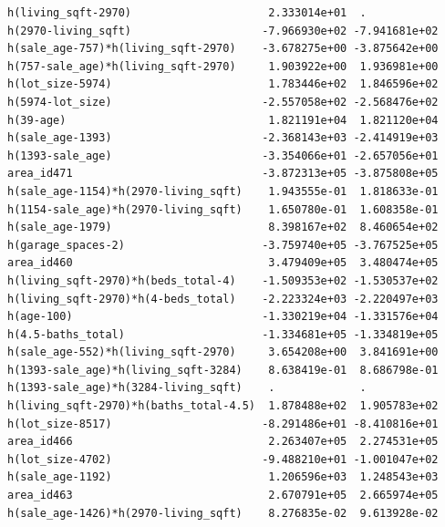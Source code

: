 \documentclass[
]{article}
\begin{document}
\begin{verbatim}
h(living_sqft-2970)                     2.333014e+01  .           
h(2970-living_sqft)                    -7.966930e+02 -7.941681e+02
h(sale_age-757)*h(living_sqft-2970)    -3.678275e+00 -3.875642e+00
h(757-sale_age)*h(living_sqft-2970)     1.903922e+00  1.936981e+00
h(lot_size-5974)                        1.783446e+02  1.846596e+02
h(5974-lot_size)                       -2.557058e+02 -2.568476e+02
h(39-age)                               1.821191e+04  1.821120e+04
h(sale_age-1393)                       -2.368143e+03 -2.414919e+03
h(1393-sale_age)                       -3.354066e+01 -2.657056e+01
area_id471                             -3.872313e+05 -3.875808e+05
h(sale_age-1154)*h(2970-living_sqft)    1.943555e-01  1.818633e-01
h(1154-sale_age)*h(2970-living_sqft)    1.650780e-01  1.608358e-01
h(sale_age-1979)                        8.398167e+02  8.460654e+02
h(garage_spaces-2)                     -3.759740e+05 -3.767525e+05
area_id460                              3.479409e+05  3.480474e+05
h(living_sqft-2970)*h(beds_total-4)    -1.509353e+02 -1.530537e+02
h(living_sqft-2970)*h(4-beds_total)    -2.223324e+03 -2.220497e+03
h(age-100)                             -1.330219e+04 -1.331576e+04
h(4.5-baths_total)                     -1.334681e+05 -1.334819e+05
h(sale_age-552)*h(living_sqft-2970)     3.654208e+00  3.841691e+00
h(1393-sale_age)*h(living_sqft-3284)    8.638419e-01  8.686798e-01
h(1393-sale_age)*h(3284-living_sqft)    .             .           
h(living_sqft-2970)*h(baths_total-4.5)  1.878488e+02  1.905783e+02
h(lot_size-8517)                       -8.291486e+01 -8.410816e+01
area_id466                              2.263407e+05  2.274531e+05
h(lot_size-4702)                       -9.488210e+01 -1.001047e+02
h(sale_age-1192)                        1.206596e+03  1.248543e+03
area_id463                              2.670791e+05  2.665974e+05
h(sale_age-1426)*h(2970-living_sqft)    8.276835e-02  9.613928e-02
                                                                  

\end{verbatim}
\end{document}
